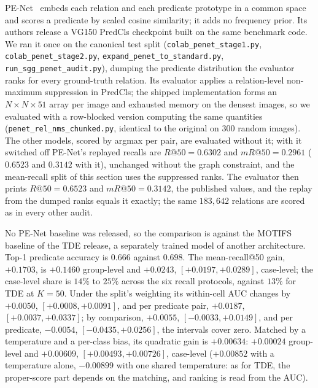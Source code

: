 PE-Net~\cite{zheng2023prototype} embeds each relation and each predicate prototype in a common
space and scores a predicate by scaled cosine similarity; it adds no frequency prior. Its authors
release a VG150 PredCls checkpoint built on the same benchmark code. We ran it once on the
canonical test split (\texttt{colab\_penet\_stage1.py}, \texttt{colab\_penet\_stage2.py},
\texttt{expand\_penet\_to\_standard.py}, \texttt{run\_sgg\_penet\_audit.py}), dumping the
predicate distribution the evaluator ranks for every ground-truth relation. Its evaluator applies
a relation-level non-maximum suppression in PredCls; the shipped implementation forms an
$N\times N\times51$ array per image and exhausted memory on the densest images, so we evaluated
with a row-blocked version computing the same quantities (\texttt{penet\_rel\_nms\_chunked.py},
identical to the original on 300 random images). The other models, scored by argmax per pair,
are evaluated without it; with it switched off PE-Net's replayed recalls are $R@50=0.6302$ and
$mR@50=0.2961$ ($0.6523$ and $0.3142$ with it), unchanged without the graph constraint, and the
mean-recall split of this section uses the suppressed ranks. The evaluator then prints $R@50=0.6523$ and
$mR@50=0.3142$, the published values, and the replay from the dumped ranks equals it exactly; the
same $183{,}642$ relations are scored as in every other audit.

No PE-Net baseline was released, so the comparison is against the MOTIFS baseline of the TDE
release, a separately trained model of another architecture. Top-1 predicate accuracy is $0.666$
against $0.698$. The mean-recall@50 gain, $+0.1703$, is $+0.1460$ group-level and $+0.0243$,
$[+0.0197,+0.0289]$, case-level; the case-level share is $14\%$ to $25\%$ across the six recall
protocols, against $13\%$ for TDE at $K=50$. Under the split's weighting its within-cell AUC changes by
$+0.0050$, $[+0.0008,+0.0091]$, and per predicate pair, $+0.0187$, $[+0.0037,+0.0337]$; by comparison,
$+0.0055$, $[-0.0033,+0.0149]$, and per predicate, $-0.0054$, $[-0.0435,+0.0256]$, the intervals
cover zero. Matched by a temperature and a per-class bias, its quadratic gain is $+0.00634$:
$+0.00024$ group-level and $+0.00609$, $[+0.00493,+0.00726]$, case-level ($+0.00852$ with a
temperature alone, $-0.00899$ with one shared temperature: as for TDE, the proper-score part
depends on the matching, and ranking is read from the AUC).

